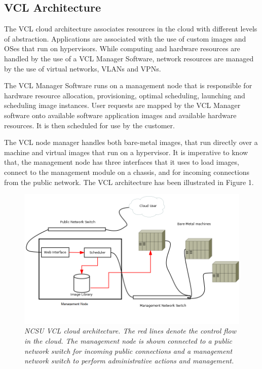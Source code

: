 \documentclass[10pt,twocolumn,pdftex]{article}
\begin{document}
\subsection{VCL Architecture}
The VCL cloud architecture \cite{vcl-arch} associates resources in the cloud with different levels of abstraction. Applications are associated with the use of custom images and OSes that run on hypervisors. While computing and hardware resources are handled by the use of a VCL Manager Software, network resources are managed by the use of virtual networks, VLANs and VPNs.

The VCL Manager Software runs on a management node that is responsible for hardware resource allocation, provisioning, optimal scheduling, launching and scheduling image instances. User requests are mapped by the VCL Manager software onto available software application images and available hardware resources. It is then scheduled for use by the customer.

The VCL node manager handles both bare-metal images, that run directly over a machine and virtual images that run on a hypervisor. It is imperative to know that, the management node has three interfaces that it uses to load images, connect to the management module on a chassis, and for incoming connections from the public network. The VCL architecture has been illustrated in Figure 1.\\

\begin{figure}[htp]
\centering
\includegraphics[scale=0.50]{csc574-vcl-architecture.png}
\caption{\small \sl NCSU VCL cloud architecture. The red lines denote the control flow in the cloud. The management node is shown connected to a public network switch for incoming public connections and a management network switch to perform administrative actions and management. }
\label{fig:solution}
\end{figure}	
\end{document}
